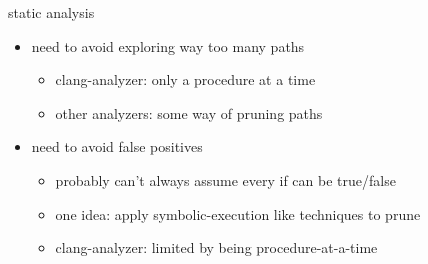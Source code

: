 \begin{frame}{static analysis}
    \begin{itemize}
    \item need to avoid exploring way too many paths
        \begin{itemize}
        \item clang-analyzer: only a procedure at a time
        \item other analyzers: some way of pruning paths
        \end{itemize}
    \item need to avoid false positives
        \begin{itemize}
        \item probably can't always assume every if can be true/false
        \item one idea: apply symbolic-execution like techniques to prune
        \item clang-analyzer: limited by being procedure-at-a-time
        \end{itemize}
    \end{itemize}
\end{frame}
